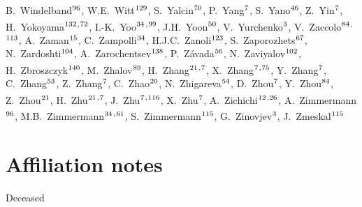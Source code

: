 \begin{flushleft}
B.~Windelband$^\textrm{\scriptsize 96}$,
W.E.~Witt$^\textrm{\scriptsize 129}$,
S.~Yalcin$^\textrm{\scriptsize 70}$,
P.~Yang$^\textrm{\scriptsize 7}$,
S.~Yano$^\textrm{\scriptsize 46}$,
Z.~Yin$^\textrm{\scriptsize 7}$,
H.~Yokoyama$^\textrm{\scriptsize 132}$\textsuperscript{,}$^\textrm{\scriptsize 72}$,
I.-K.~Yoo$^\textrm{\scriptsize 34}$\textsuperscript{,}$^\textrm{\scriptsize 99}$,
J.H.~Yoon$^\textrm{\scriptsize 50}$,
V.~Yurchenko$^\textrm{\scriptsize 3}$,
V.~Zaccolo$^\textrm{\scriptsize 84}$\textsuperscript{,}$^\textrm{\scriptsize 113}$,
A.~Zaman$^\textrm{\scriptsize 15}$,
C.~Zampolli$^\textrm{\scriptsize 34}$,
H.J.C.~Zanoli$^\textrm{\scriptsize 123}$,
S.~Zaporozhets$^\textrm{\scriptsize 67}$,
N.~Zardoshti$^\textrm{\scriptsize 104}$,
A.~Zarochentsev$^\textrm{\scriptsize 138}$,
P.~Z\'{a}vada$^\textrm{\scriptsize 56}$,
N.~Zaviyalov$^\textrm{\scriptsize 102}$,
H.~Zbroszczyk$^\textrm{\scriptsize 140}$,
M.~Zhalov$^\textrm{\scriptsize 89}$,
H.~Zhang$^\textrm{\scriptsize 21}$\textsuperscript{,}$^\textrm{\scriptsize 7}$,
X.~Zhang$^\textrm{\scriptsize 7}$\textsuperscript{,}$^\textrm{\scriptsize 75}$,
Y.~Zhang$^\textrm{\scriptsize 7}$,
C.~Zhang$^\textrm{\scriptsize 53}$,
Z.~Zhang$^\textrm{\scriptsize 7}$,
C.~Zhao$^\textrm{\scriptsize 20}$,
N.~Zhigareva$^\textrm{\scriptsize 54}$,
D.~Zhou$^\textrm{\scriptsize 7}$,
Y.~Zhou$^\textrm{\scriptsize 84}$,
Z.~Zhou$^\textrm{\scriptsize 21}$,
H.~Zhu$^\textrm{\scriptsize 21}$\textsuperscript{,}$^\textrm{\scriptsize 7}$,
J.~Zhu$^\textrm{\scriptsize 7}$\textsuperscript{,}$^\textrm{\scriptsize 116}$,
X.~Zhu$^\textrm{\scriptsize 7}$,
A.~Zichichi$^\textrm{\scriptsize 12}$\textsuperscript{,}$^\textrm{\scriptsize 26}$,
A.~Zimmermann$^\textrm{\scriptsize 96}$,
M.B.~Zimmermann$^\textrm{\scriptsize 34}$\textsuperscript{,}$^\textrm{\scriptsize 61}$,
S.~Zimmermann$^\textrm{\scriptsize 115}$,
G.~Zinovjev$^\textrm{\scriptsize 3}$,
J.~Zmeskal$^\textrm{\scriptsize 115}$
\renewcommand\labelenumi{\textsuperscript{\theenumi}~}

\section*{Affiliation notes}
\renewcommand\theenumi{\roman{enumi}}
\begin{Authlist}
\item {}Deceased
\item {}
\item {}
\item {}
\end{Authlist}


\end{flushleft}
